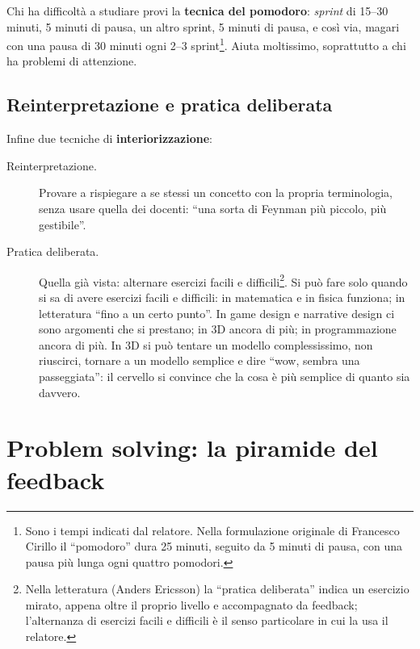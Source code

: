 Chi ha difficoltà a studiare provi la \textbf{tecnica del pomodoro}:
\emph{sprint} di 15--30 minuti, 5 minuti di pausa, un altro sprint, 5
minuti di pausa, e così via, magari con una pausa di 30 minuti ogni 2--3
sprint\footnote{Sono i tempi indicati dal relatore. Nella formulazione
originale di Francesco Cirillo il ``pomodoro'' dura 25 minuti, seguito da
5 minuti di pausa, con una pausa più lunga ogni quattro pomodori.}. Aiuta
moltissimo, soprattutto a chi ha problemi di attenzione.

\subsection{Reinterpretazione e pratica deliberata}

Infine due tecniche di \textbf{interiorizzazione}:
\begin{description}
  \item[Reinterpretazione.] Provare a rispiegare a se stessi un concetto
        con la propria terminologia, senza usare quella dei docenti: ``una
        sorta di Feynman più piccolo, più gestibile''.
  \item[Pratica deliberata.] Quella già vista: alternare esercizi facili e
        difficili\footnote{Nella letteratura (Anders Ericsson) la
        ``pratica deliberata'' indica un esercizio mirato, appena oltre
        il proprio livello e accompagnato da feedback; l'alternanza di
        esercizi facili e difficili è il senso particolare in cui la usa
        il relatore.}. Si può fare solo quando si sa di avere esercizi
        facili e difficili: in matematica e in fisica funziona; in
        letteratura ``fino a un certo punto''. In game design e narrative
        design ci sono argomenti che si prestano; in 3D ancora di più; in
        programmazione ancora di più. In 3D si può tentare un modello
        complessissimo, non riuscirci, tornare a un modello semplice e
        dire ``wow, sembra una passeggiata'': il cervello si convince che la
        cosa è più semplice di quanto sia davvero.
\end{description}

\section{Problem solving: la piramide del feedback}
\label{p0:sec:feedback}

